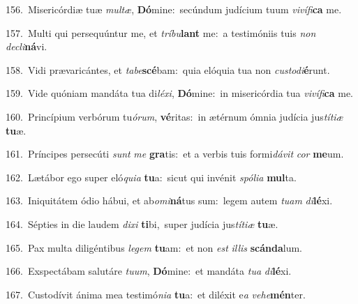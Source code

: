 {\numbfont\textcolor{\numbcolor}{156.}}~Misericórdiæ tuæ \textit{mul}\-\textit{tæ}, \textbf{Dó}\-mine:~\star secúndum judícium tuum \textit{vi}\-\textit{ví}\textit{fi}\textbf{ca} me.\par
{\numbfont\textcolor{\numbcolor}{157.}}~Multi qui persequúntur me, et \textit{trí}\-\textit{bu}\textbf{lant} me:~\star a testimóniis tuis \textit{non} \textit{de}\-\textit{cli}\textbf{ná}vi.\par
{\numbfont\textcolor{\numbcolor}{158.}}~Vidi prævaricántes, et \textit{ta}\-\textit{be}\textbf{scé}bam:~\star quia elóquia tua non \textit{cus}\-\textit{to}\textit{di}\textbf{é}runt.\par
{\numbfont\textcolor{\numbcolor}{159.}}~Vide quóniam mandáta tua di\-\textit{lé}\-\textit{xi}, \textbf{Dó}\-mine:~\star in misericórdia tua \textit{vi}\-\textit{ví}\textit{fi}\textbf{ca} me.\par
{\numbfont\textcolor{\numbcolor}{160.}}~Princípium verbórum tu\-\textit{ó}\-\textit{rum}, \textbf{vé}\-ritas:~\star in ætérnum ómnia judícia jus\-\textit{tí}\-\textit{ti}\textit{æ} \textbf{tu}\-æ.\par
{\numbfont\textcolor{\numbcolor}{161.}}~Príncipes persecúti \textit{sunt} \textit{me} \textbf{gra}\-tis:~\star et a verbis tuis formi\-\textit{dá}\-\textit{vit} \textit{cor} \textbf{me}\-um.\par
{\numbfont\textcolor{\numbcolor}{162.}}~Lætábor ego super eló\-\textit{qui}\-\textit{a} \textbf{tu}\-a:~\star sicut qui invénit \textit{spó}\-\textit{li}\textit{a} \textbf{mul}\-ta.\par
{\numbfont\textcolor{\numbcolor}{163.}}~Iniquitátem ódio hábui, et ab\-\textit{o}\-\textit{mi}\textbf{ná}tus sum:~\star legem autem \textit{tu}\-\textit{am} \textit{di}\-\textbf{lé}xi.\par
{\numbfont\textcolor{\numbcolor}{164.}}~Sépties in die laudem \textit{di}\-\textit{xi} \textbf{ti}\-bi,~\star super judícia jus\-\textit{tí}\-\textit{ti}\textit{æ} \textbf{tu}\-æ.\par
{\numbfont\textcolor{\numbcolor}{165.}}~Pax multa diligéntibus \textit{le}\-\textit{gem} \textbf{tu}\-am:~\star et non \textit{est} \textit{il}\-\textit{lis} \textbf{scán}\-\textbf{da}lum.\par
{\numbfont\textcolor{\numbcolor}{166.}}~Exspectábam salutáre \textit{tu}\-\textit{um}, \textbf{Dó}\-mine:~\star et mandáta \textit{tu}\-\textit{a} \textit{di}\-\textbf{lé}xi.\par
{\numbfont\textcolor{\numbcolor}{167.}}~Custodívit ánima mea testimó\-\textit{ni}\-\textit{a} \textbf{tu}\-a:~\star et diléxit e\textit{a} \textit{ve}\-\textit{he}\textbf{mén}ter.\par
